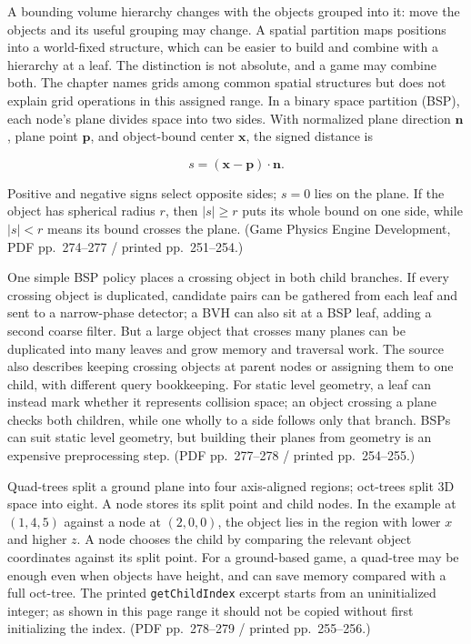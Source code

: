 A bounding volume hierarchy changes with the objects grouped into it: move the objects and its useful grouping may change. A spatial partition maps positions into a world-fixed structure, which can be easier to build and combine with a hierarchy at a leaf. The distinction is not absolute, and a game may combine both. The chapter names grids among common spatial structures but does not explain grid operations in this assigned range. In a binary space partition (BSP), each node's plane divides space into two sides. With normalized plane direction \(\mathbf{n}\), plane point \(\mathbf{p}\), and object-bound center \(\mathbf{x}\), the signed distance is

\[
s=(\mathbf{x}-\mathbf{p})\cdot\mathbf{n}.
\]

Positive and negative signs select opposite sides; \(s=0\) lies on the plane. If the object has spherical radius \(r\), then \(|s|\geq r\) puts its whole bound on one side, while \(|s|<r\) means its bound crosses the plane. (Game Physics Engine Development, PDF pp.~274--277 / printed pp.~251--254.)

One simple BSP policy places a crossing object in both child branches. If every crossing object is duplicated, candidate pairs can be gathered from each leaf and sent to a narrow-phase detector; a BVH can also sit at a BSP leaf, adding a second coarse filter. But a large object that crosses many planes can be duplicated into many leaves and grow memory and traversal work. The source also describes keeping crossing objects at parent nodes or assigning them to one child, with different query bookkeeping. For static level geometry, a leaf can instead mark whether it represents collision space; an object crossing a plane checks both children, while one wholly to a side follows only that branch. BSPs can suit static level geometry, but building their planes from geometry is an expensive preprocessing step. (PDF pp.~277--278 / printed pp.~254--255.)

Quad-trees split a ground plane into four axis-aligned regions; oct-trees split 3D space into eight. A node stores its split point and child nodes. In the example at \((1,4,5)\) against a node at \((2,0,0)\), the object lies in the region with lower \(x\) and higher \(z\). A node chooses the child by comparing the relevant object coordinates against its split point. For a ground-based game, a quad-tree may be enough even when objects have height, and can save memory compared with a full oct-tree. The printed \texttt{getChildIndex} excerpt starts from an uninitialized integer; as shown in this page range it should not be copied without first initializing the index. (PDF pp.~278--279 / printed pp.~255--256.)

